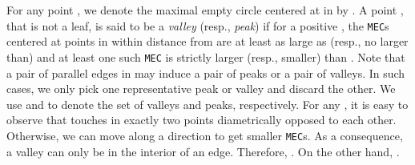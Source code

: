 \documentclass[12pt]{llncs}
\begin{document}
For any point , we denote the maximal empty circle centered at  in  
by .
A point , that is not a leaf, is said to be a {\it
valley} (resp., {\it peak}) if for a positive , the {\tt MEC}s
centered at points in  within  distance  from  are at
least as large as (resp., no larger than)  and at least 
one such {\tt MEC} is strictly larger (resp., smaller) than . Note that a pair of parallel edges in  may induce a pair of peaks or a pair of 
valleys. In such cases, we only pick one representative peak or valley and discard the 
other. We use  and  to denote the set of valleys and 
peaks, 
respectively.  For any , it is easy to observe that  touches  in exactly two points diametrically opposed to each other. Otherwise, we can move along a direction to get smaller {\tt MEC}s. 
 As a consequence, a valley can only be in the interior of an edge.
Therefore, . On the other hand, . 
\end{document}
